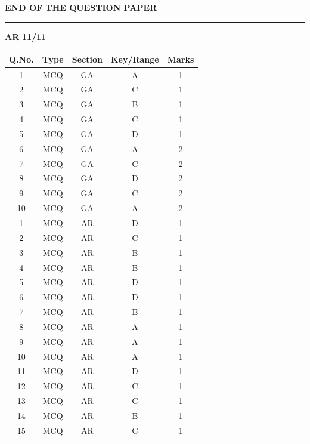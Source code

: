 \documentclass{article}
\begin{document}
\vspace{1cm}

\begin{center}
\textbf{END OF THE QUESTION PAPER}
\end{center}

\vspace{5.5cm}
 \noindent
\hrule \vspace{0.0875CM} \textbf{AR} \hfill  \textbf{11/11}

\newpage



\vspace{0.5cm}

\renewcommand{\arraystretch}{2.2} %
\setlength{\tabcolsep}{20pt} %
\hspace{1.5cm}
\begin{tabular}{|c|c|c|c|c|}
\hline
\rowcolor{orange!30} %
\textbf{Q.No.} & \textbf{Type} & \textbf{Section} & \textbf{Key/Range} & \textbf{Marks} \\
\hline
1  & MCQ & GA & A & 1 \\ \hline
2  & MCQ & GA & C & 1 \\ \hline
3  & MCQ & GA & B & 1 \\ \hline
4  & MCQ & GA & C & 1 \\ \hline
5  & MCQ & GA & D & 1 \\ \hline
6  & MCQ & GA & A & 2 \\ \hline
7  & MCQ & GA & C & 2 \\ \hline
8  & MCQ & GA & D & 2 \\ \hline
9  & MCQ & GA & C & 2 \\ \hline
10 & MCQ & GA & A & 2 \\ \hline
1  & MCQ & AR & D & 1 \\ \hline
2  & MCQ & AR & C & 1 \\ \hline
3  & MCQ & AR & B & 1 \\ \hline
4  & MCQ & AR & B & 1 \\ \hline
5  & MCQ & AR & D & 1 \\ \hline
6  & MCQ & AR & D & 1 \\ \hline
7  & MCQ & AR & B & 1 \\ \hline
8  & MCQ & AR & A & 1 \\ \hline
9  & MCQ & AR & A & 1 \\ \hline
10 & MCQ & AR & A & 1 \\ \hline
11 & MCQ & AR & D & 1 \\ \hline
12 & MCQ & AR & C & 1 \\ \hline
13 & MCQ & AR & C & 1 \\ \hline
14 & MCQ & AR & B & 1 \\ \hline
15 & MCQ & AR & C & 1 \\ \hline
\end{tabular}
\vspace{1.5cm}
\end{document}
